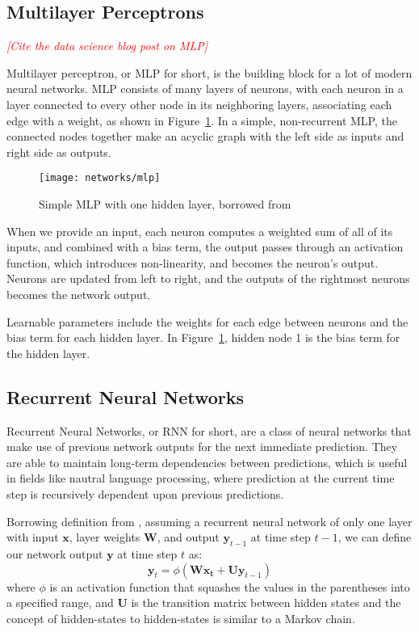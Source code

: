 \documentclass[10pt,twocolumn,letterpaper]{article}
\newcommand{\todo}[1]{\textcolor{red}{{\em [#1]}} }
\newcommand{\figref}[1]{Figure~\ref{fig:#1}}
\newcommand{\matr}[1]{\mathbf{#1}}
\newcommand{\bs}[1]{\boldsymbol{#1}}
\begin{document}
\subsection{Multilayer Perceptrons}
\todo{Cite the data science blog post on MLP}

Multilayer perceptron, or MLP for short, is the building block for a lot of
modern neural networks. MLP consists of many layers of neurons, with each
neuron in a layer connected to every other node in its neighboring layers,
associating each edge with a weight, as shown in \figref{mlp}. In a simple,
non-recurrent MLP, the connected nodes together make an acyclic graph with the
left side as inputs and right side as outputs. 
 
\begin{figure}
  \centering
  \texttt{[image: networks/mlp]}
  \caption{Simple MLP with one hidden layer, borrowed from \cite{datasciencemlp}}
  \label{fig:mlp}
\end{figure}
 
When we provide an input, each neuron computes a weighted sum of all of its
inputs, and combined with a bias term, the output passes through an activation
function, which introduces non-linearity, and becomes the neuron's output.
Neurons are updated from left to right, and the outputs of the rightmost
neurons becomes the network output.

Learnable parameters include the weights for each edge between neurons and the
bias term for each hidden layer. In \figref{mlp}, hidden node 1 is the bias
term for the hidden layer.

\subsection{Recurrent Neural Networks}

Recurrent Neural Networks, or RNN for short, are a class of neural networks
that make use of previous network outputs for the next immediate prediction.
They are able to maintain long-term dependencies between predictions, which is
useful in fields like nautral language processing, where prediction at the
current time step is recursively dependent upon previous predictions.

Borrowing definition from \cite{deeplearning4jrnn}, assuming a recurrent
neural network of only one layer with input $\bm{x}$, layer weights $\bm{W}$,
and output $\bm{y}_{t-1}$ at time step $t-1$, we can define our network output
$\bs{y}$ at time step $t$ as:
%
\begin{equation}
  \bs{y}_t = \phi (\bm{W} \matr{x_t} + \bm{U} \bs{y}_{t-1})
\end{equation}
%
where $\phi$ is an activation function that squashes the values in the
parentheses into a specified range, and $\bm{U}$ is the transition matrix
between hidden states and the concept of hidden-states to hidden-states is
similar to a Markov chain.
\end{document}
